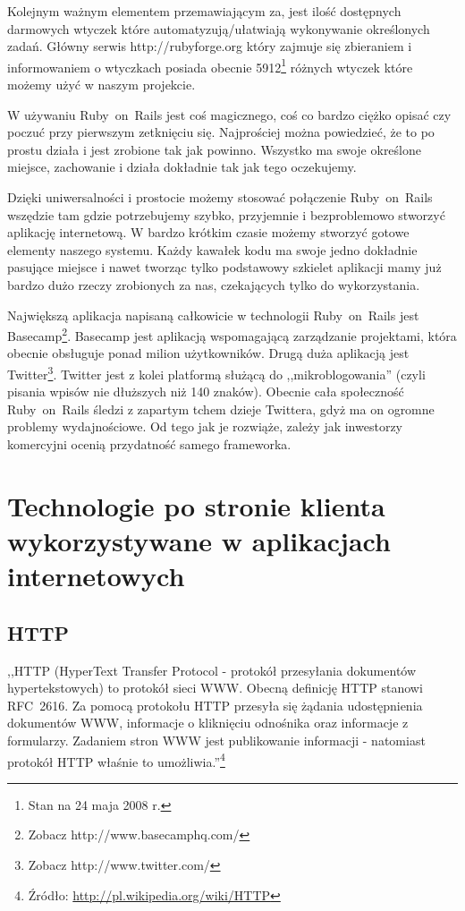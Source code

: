 \documentclass[a4paper,12pt,oneside]{report}
\begin{document}
Kolejnym ważnym elementem przemawiającym za, jest ilość dostępnych darmowych wtyczek które automatyzują/ułatwiają wykonywanie określonych zadań. Główny serwis http://rubyforge.org który zajmuje się zbieraniem i informowaniem o wtyczkach posiada obecnie 5912\footnote{Stan na 24 maja 2008 r.} różnych wtyczek które możemy użyć w naszym projekcie.

W używaniu Ruby~on~Rails jest coś magicznego, coś co bardzo ciężko opisać czy poczuć przy pierwszym zetknięciu się. Najprościej można powiedzieć, że to po prostu działa i jest zrobione tak jak powinno. Wszystko ma swoje określone miejsce, zachowanie i działa dokładnie tak jak tego oczekujemy.

Dzięki uniwersalności i prostocie możemy stosować połączenie Ruby~on~Rails wszędzie tam gdzie potrzebujemy szybko, przyjemnie i bezproblemowo stworzyć aplikację internetową. W bardzo krótkim czasie możemy stworzyć gotowe elementy naszego systemu. Każdy kawałek kodu ma swoje jedno dokładnie pasujące miejsce i nawet tworząc tylko podstawowy szkielet aplikacji mamy już bardzo dużo rzeczy zrobionych za nas, czekających tylko do wykorzystania.

Największą aplikacja napisaną całkowicie w technologii Ruby~on~Rails jest Basecamp\footnote{Zobacz http://www.basecamphq.com/}. Basecamp jest aplikacją wspomagającą zarządzanie projektami, która obecnie obsługuje ponad milion użytkowników. Drugą duża aplikacją jest Twitter\footnote{Zobacz http://www.twitter.com/}. Twitter jest z kolei platformą służącą do ,,mikroblogowania'' (czyli pisania wpisów nie dłuższych niż 140 znaków). Obecnie cała społeczność Ruby~on~Rails śledzi z zapartym tchem dzieje Twittera, gdyż ma on ogromne problemy wydajnościowe. Od tego jak je rozwiąże, zależy jak inwestorzy komercyjni ocenią przydatność samego frameworka.

\chapter[Technologie po stronie klienta]{Technologie po stronie klienta wykorzystywane w aplikacjach internetowych}
\label{cha:klient}

\section{HTTP}
\label{sec:http}
,,HTTP (HyperText Transfer Protocol - protokół przesyłania dokumentów hypertekstowych) to protokół sieci WWW. Obecną definicję HTTP stanowi RFC~2616. Za pomocą protokołu HTTP przesyła się żądania udostępnienia dokumentów WWW, informacje o kliknięciu odnośnika oraz informacje z formularzy. Zadaniem stron WWW jest publikowanie informacji - natomiast protokół HTTP właśnie to umożliwia.''\footnote{Źródło: \url{http://pl.wikipedia.org/wiki/HTTP}}
\end{document}

